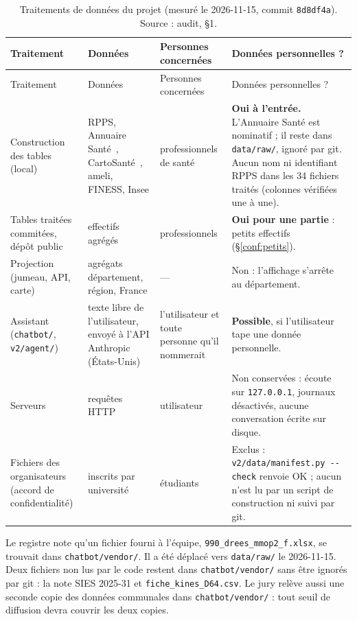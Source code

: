 \begin{small}
\begin{longtable}{@{}p{}p{}p{}p{}@{}}
\caption{Traitements de données du projet (mesuré le 2026-11-15, commit \texttt{8d8df4a}). Source : audit, §1.}\label{conf:tab-inventaire}\\
\toprule Traitement & Données & Personnes concernées & Données personnelles ? \\ \midrule\endfirsthead
\toprule Traitement & Données & Personnes concernées & Données personnelles ? \\ \midrule\endhead
\bottomrule\endfoot
Construction des tables (local) & RPPS, Annuaire Santé~\citep{e-ans2026annuaire}, CartoSanté~\citep{e-cartosante2026}, ameli, FINESS, Insee & professionnels de santé & \textbf{Oui à l'entrée.} L'Annuaire Santé est nominatif ; il reste dans \texttt{data/\allowbreak{}raw/\allowbreak{}}, ignoré par git. Aucun nom ni identifiant RPPS dans les 34\mesure{} fichiers traités (colonnes vérifiées une à une). \\
Tables traitées commitées, dépôt public & effectifs agrégés & professionnels & \textbf{Oui pour une partie} : petits effectifs (§\ref{conf:petits}). \\
Projection (jumeau, API, carte) & agrégats département, région, France & --- & Non : l'affichage s'arrête au département. \\
Assistant (\texttt{chatbot/\allowbreak{}}, \texttt{v2/\allowbreak{}agent/\allowbreak{}}) & texte libre de l'utilisateur, envoyé à l'API Anthropic (États-Unis) & l'utilisateur et toute personne qu'il nommerait & \textbf{Possible}, si l'utilisateur tape une donnée personnelle. \\
Serveurs & requêtes HTTP & utilisateur & Non conservées : écoute sur \texttt{127.0.0.1}, journaux désactivés, aucune conversation écrite sur disque. \\
Fichiers des organisateurs (accord de confidentialité) & inscrits par université & étudiants & Exclus : \texttt{v2/\allowbreak{}data/\allowbreak{}manifest.py -\allowbreak{}-\allowbreak{}check} renvoie OK ; aucun n'est lu par un script de construction ni suivi par git. \\
\end{longtable}
\end{small}

Le registre note qu'un fichier fourni à l'équipe, \texttt{990\_\allowbreak{}drees\_\allowbreak{}mmop2\_\allowbreak{}f.xlsx}, se trouvait dans \texttt{chatbot/\allowbreak{}vendor/\allowbreak{}}. Il a été déplacé vers \texttt{data/\allowbreak{}raw/\allowbreak{}} le 2026-11-15.
Deux fichiers non lus par le code restent dans \texttt{chatbot/\allowbreak{}vendor/\allowbreak{}} sans être ignorés par git : la note SIES 2025-31 et \texttt{fiche\_\allowbreak{}kines\_\allowbreak{}D64.csv}.
Le jury relève aussi une seconde copie des données communales dans \texttt{chatbot/\allowbreak{}vendor/\allowbreak{}} : tout seuil de diffusion devra couvrir les deux copies.

